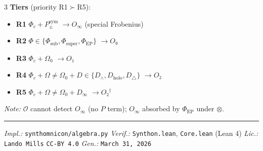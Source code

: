 \documentclass[8pt,a4paper,landscape]{article}
\begin{document}
\begin{multicols}{3}
\textbf{Tiers} (priority R1$\succ$R5):
\begin{itemize}[leftmargin=*,nosep,topsep=2pt,itemsep=1pt]
\item \textbf{R1} $\Phi_c+P_\pm^{\text{sym}}$ $\to O_\infty$ (special Frobenius)
\item \textbf{R2} $\Phi\in\{\Phi_{\text{sub}},\Phi_{\text{super}},\Phi_{\text{EP}}\}$ $\to O₀$
\item \textbf{R3} $\Phi_c+\Omega_0$ $\to O₁$
\item \textbf{R4} $\Phi_c+\Omega{\neq}\Omega_0+D\in\{D_\wedge,D_{\text{holo}},D_\triangle\}$ $\to O₂$
\item \textbf{R5} $\Phi_c+\Omega{\neq}\Omega_0+D_\infty$ $\to O₂^\dagger$
\end{itemize}
\textit{Note:} $\mathcal{O}$ cannot detect $O_\infty$ (no $P$ term); $O_\infty$ absorbed by $\Phi_{\text{EP}}$ under $\otimes$.

\end{multicols}

\vfill
\noindent\hrule
\vspace{0.1em}
\noindent\footnotesize
\textit{Impl.:} \texttt{synthomnicon/algebra.py} \quad
\textit{Verif.:} \texttt{Synthon.lean}, \texttt{Core.lean} (Lean 4) \quad
\textit{Lic.:} \texttt{Lando Mills} \texttt{CC-BY 4.0} \quad
\textit{Gen.:} \texttt{March 31, 2026} \quad
\end{document}
